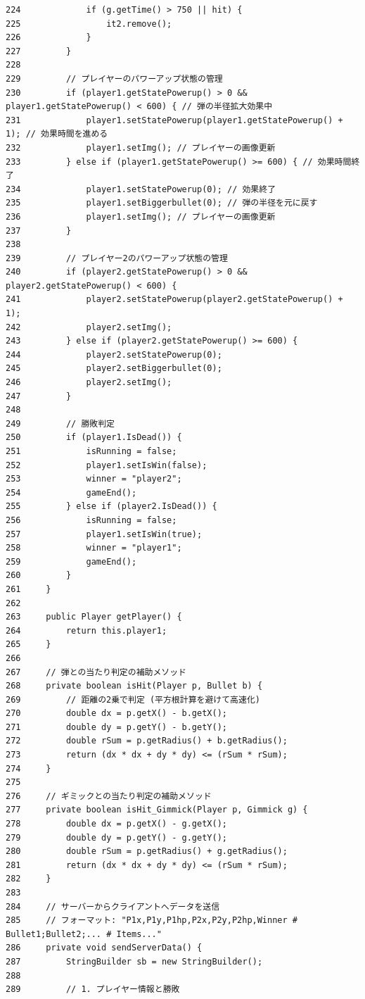 \documentclass[11pt,a4j]{jarticle}
\begin{document}
\begin{small}
\begin{verbatim}
224             if (g.getTime() > 750 || hit) {
225                 it2.remove();
226             }
227         }
228 
229         // プレイヤーのパワーアップ状態の管理
230         if (player1.getStatePowerup() > 0 && player1.getStatePowerup() < 600) { // 弾の半径拡大効果中
231             player1.setStatePowerup(player1.getStatePowerup() + 1); // 効果時間を進める
232             player1.setImg(); // プレイヤーの画像更新
233         } else if (player1.getStatePowerup() >= 600) { // 効果時間終了
234             player1.setStatePowerup(0); // 効果終了
235             player1.setBiggerbullet(0); // 弾の半径を元に戻す
236             player1.setImg(); // プレイヤーの画像更新
237         }
238 
239         // プレイヤー2のパワーアップ状態の管理
240         if (player2.getStatePowerup() > 0 && player2.getStatePowerup() < 600) {
241             player2.setStatePowerup(player2.getStatePowerup() + 1);
242             player2.setImg();
243         } else if (player2.getStatePowerup() >= 600) {
244             player2.setStatePowerup(0);
245             player2.setBiggerbullet(0);
246             player2.setImg();
247         }
248 
249         // 勝敗判定
250         if (player1.IsDead()) {
251             isRunning = false;
252             player1.setIsWin(false);
253             winner = "player2";
254             gameEnd();
255         } else if (player2.IsDead()) {
256             isRunning = false;
257             player1.setIsWin(true);
258             winner = "player1";
259             gameEnd();
260         }
261     }
262 
263     public Player getPlayer() {
264         return this.player1;
265     }
266 
267     // 弾との当たり判定の補助メソッド
268     private boolean isHit(Player p, Bullet b) {
269         // 距離の2乗で判定 (平方根計算を避けて高速化)
270         double dx = p.getX() - b.getX();
271         double dy = p.getY() - b.getY();
272         double rSum = p.getRadius() + b.getRadius();
273         return (dx * dx + dy * dy) <= (rSum * rSum);
274     }
275 
276     // ギミックとの当たり判定の補助メソッド
277     private boolean isHit_Gimmick(Player p, Gimmick g) {
278         double dx = p.getX() - g.getX();
279         double dy = p.getY() - g.getY();
280         double rSum = p.getRadius() + g.getRadius();
281         return (dx * dx + dy * dy) <= (rSum * rSum);
282     }
283 
284     // サーバーからクライアントへデータを送信
285     // フォーマット: "P1x,P1y,P1hp,P2x,P2y,P2hp,Winner # Bullet1;Bullet2;... # Items..."
286     private void sendServerData() {
287         StringBuilder sb = new StringBuilder();
288 
289         // 1. プレイヤー情報と勝敗

\end{verbatim}
\end{small}
\end{document}

